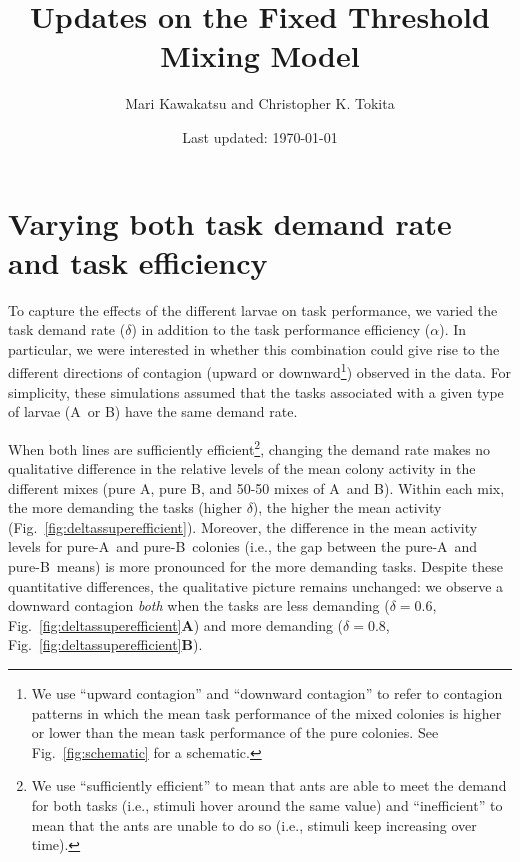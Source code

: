 \documentclass[11pt]{article}
\title{\vspace{-30pt}Updates on the Fixed Threshold Mixing Model}
\author{Mari Kawakatsu and Christopher K. Tokita\vspace{-10pt}}
\date{Last updated: \today}
\newcommand{\A}{{\color{red}A}}
\newcommand{\B}{{\color{blue}B}}
\begin{document}
\maketitle

\tableofcontents


\newpage
\section{Varying both task demand rate and task efficiency} \label{sec:varyalphadelta}

To capture the effects of the different larvae on task performance, we varied the task demand rate ($\delta$) in addition to the task performance efficiency ($\alpha$). In particular, we were interested in whether this combination could give rise to the different directions of contagion (upward or downward\footnote{We use ``upward contagion'' and ``downward contagion'' to refer to contagion patterns in which the mean task performance of the mixed colonies is higher or lower than the mean task performance of the pure colonies. See Fig.~\ref{fig:schematic} for a schematic.}) observed in the data. 
For simplicity, these simulations assumed that the tasks associated with a given type of larvae (\A\ or \B) have the same demand rate.

When both lines are sufficiently efficient\footnote{We use ``sufficiently efficient'' to mean that ants are able to meet the demand for both tasks (i.e., stimuli hover around the same value) and ``inefficient'' to mean that the ants are unable to do so (i.e., stimuli keep increasing over time).}, changing the demand rate makes no qualitative difference in the relative levels of the mean colony activity in the different mixes (pure \A, pure \B, and 50-50 mixes of \A\ and \B). Within each mix, the more demanding the tasks (higher $\delta$), the higher the mean activity (Fig.~\ref{fig:deltassuperefficient}).  Moreover, the difference in the mean activity levels for pure-\A\ and pure-\B\ colonies (i.e., the gap between the pure-\A\ and pure-\B\ means) is more pronounced for the more demanding tasks. Despite these quantitative differences, the qualitative picture remains unchanged:
we observe a downward contagion \textit{both} when the tasks are less demanding ($\delta = 0.6$, Fig.~\ref{fig:deltassuperefficient}\textbf{A}) and more demanding ($\delta = 0.8$, Fig.~\ref{fig:deltassuperefficient}\textbf{B}).
\end{document}
